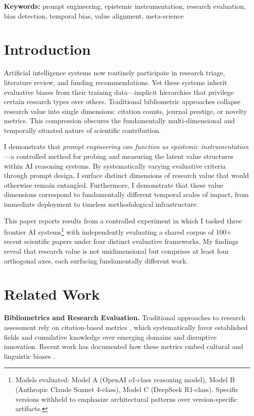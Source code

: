 \documentclass{article}
\begin{document}
\noindent\textbf{Keywords:} prompt engineering, epistemic instrumentation, research evaluation, bias detection, temporal bias, value alignment, meta-science

\section{Introduction}

Artificial intelligence systems now routinely participate in research triage, literature review, and funding recommendations. Yet these systems inherit evaluative biases from their training data—implicit hierarchies that privilege certain research types over others. Traditional bibliometric approaches collapse research value into single dimensions: citation counts, journal prestige, or novelty metrics. This compression obscures the fundamentally multi-dimensional and temporally situated nature of scientific contribution.

I demonstrate that \textit{prompt engineering can function as epistemic instrumentation}—a controlled method for probing and measuring the latent value structures within AI reasoning systems. By systematically varying evaluative criteria through prompt design, I surface distinct dimensions of research value that would otherwise remain entangled. Furthermore, I demonstrate that these value dimensions correspond to fundamentally different temporal scales of impact, from immediate deployment to timeless methodological infrastructure.

This paper reports results from a controlled experiment in which I tasked three frontier AI systems\footnote{Models evaluated: Model A (OpenAI o1-class reasoning model), Model B (Anthropic Claude Sonnet 4-class), Model C (DeepSeek R1-class). Specific versions withheld to emphasize architectural patterns over version-specific artifacts.} with independently evaluating a shared corpus of 100+ recent scientific papers under four distinct evaluative frameworks. My findings reveal that research value is not unidimensional but comprises at least four orthogonal axes, each surfacing fundamentally different work.

\section{Related Work}

\textbf{Bibliometrics and Research Evaluation.} Traditional approaches to research assessment rely on citation-based metrics \cite{fortunato2018science, bornmann2008citation}, which systematically favor established fields and cumulative knowledge over emerging domains and disruptive innovation. Recent work has documented how these metrics embed cultural and linguistic biases \cite{bender2021dangers}.
\end{document}
